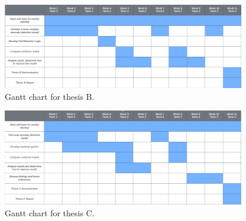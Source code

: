 \begin{figure}[H]
    \centering
    \includegraphics[width=400px, keepaspectratio]{gant2.png}
    \vspace{1ex}%
    \caption{Gantt chart for thesis B.}
    \label{fig:my_label}
\end{figure}

\begin{figure}[H]
    \centering
    \includegraphics[width=400px, keepaspectratio]{gant3.png}
    \vspace{1ex}%
    \caption{Gantt chart for thesis C.}
    \label{fig:my_label}
\end{figure}